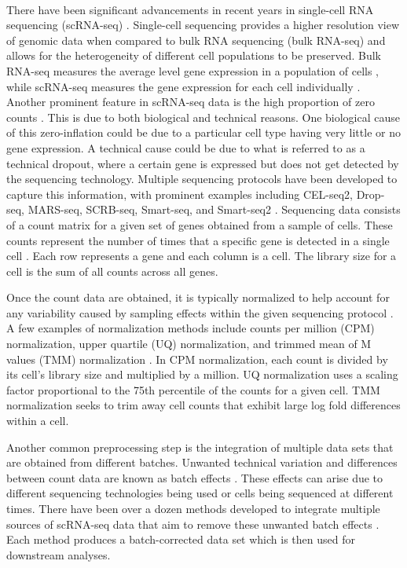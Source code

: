 \documentclass[
12pt, %
letterpaper, %
oneside, %
headinclude,footinclude, %
BCOR5mm, %
]{scrartcl}
\begin{document}
\paragraph*{}
There have been significant advancements in recent years in single-cell RNA sequencing (scRNA-seq) \citep{luecken2019current}. Single-cell sequencing provides a higher resolution view of genomic data when compared to bulk RNA sequencing (bulk RNA-seq) and allows for the heterogeneity of different cell populations to be preserved. Bulk RNA-seq measures the average level gene expression in a population of cells \citep{wang2009rna}, while scRNA-seq measures the gene expression for each cell individually \citep{wang2015advances}.
Another prominent feature in scRNA-seq data is the high proportion of zero counts \citep{vallejos2017normalizing}. This is due to both biological and technical reasons. One biological cause of this zero-inflation could be due to a particular cell type having very little or no gene expression. A technical cause could be due to what is referred to as a technical dropout, where a certain gene is expressed but does not get detected by the sequencing technology.
Multiple sequencing protocols have been developed to capture this information, with prominent examples including CEL-seq2, Drop-seq, MARS-seq, SCRB-seq, Smart-seq, and Smart-seq2 \citep{ziegenhain2017comparative}.
Sequencing data consists of a count matrix for a given set of genes obtained from a sample of cells. These counts represent the number of times that a specific gene is detected in a single cell \citep{grun2015design}. 
Each row represents a gene and each column is a cell. The library size for a cell is the sum of all counts across all genes. 

Once the count data are obtained, it is typically normalized to help account for any variability caused by sampling effects within the given sequencing protocol \citep{grun2015design}.
A few examples of normalization methods include counts per million (CPM) normalization, upper quartile (UQ) normalization, and trimmed mean of M values (TMM) normalization \citep{vallejos2017normalizing}. In CPM normalization, each count is divided by its cell's library size and multiplied by a million. UQ normalization uses a scaling factor proportional to the 75th percentile of the counts for a given cell. TMM normalization seeks to trim away cell counts that exhibit large log fold differences within a cell.

Another common preprocessing step is the integration of multiple data sets that are obtained from different batches. Unwanted technical variation and differences between count data are known as batch effects \citep{zhang2020combat}. These effects can arise due to different sequencing technologies being used or cells being sequenced at different times.
There have been over a dozen methods developed to integrate multiple sources of scRNA-seq data that aim to remove these unwanted batch effects \citep{tran2020benchmark}. Each method produces a batch-corrected data set which is then used for downstream analyses.
\end{document}
